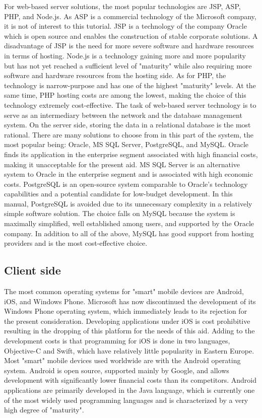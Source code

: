 For web-based server solutions, the most popular technologies are JSP, ASP, PHP, and Node.js. As ASP is a commercial technology of the Microsoft company, it is not of interest to this tutorial. JSP is a technology of the company Oracle which is open source and enables the construction of stable corporate solutions. A disadvantage of JSP is the need for more severe software and hardware resources in terms of hosting. Node.js is a technology gaining more and more popularity but has not yet reached a sufficient level of "maturity" while also requiring more software and hardware resources from the hosting side. As for PHP, the technology is narrow-purpose and has one of the highest "maturity" levels. At the same time, PHP hosting costs are among the lowest, making the choice of this technology extremely cost-effective. The task of web-based server technology is to serve as an intermediary between the network and the database management system. On the server side, storing the data in a relational database is the most rational. There are many solutions to choose from in this part of the system, the most popular being: Oracle, MS SQL Server, PostgreSQL, and MySQL. Oracle finds its application in the enterprise segment associated with high financial costs, making it unacceptable for the present aid. MS SQL Server is an alternative system to Oracle in the enterprise segment and is associated with high economic costs. PostgreSQL is an open-source system comparable to Oracle's technology capabilities and a potential candidate for low-budget development. In this manual, PostgreSQL is avoided due to its unnecessary complexity in a relatively simple software solution. The choice falls on MySQL because the system is maximally simplified, well established among users, and supported by the Oracle company. In addition to all of the above, MySQL has good support from hosting providers and is the most cost-effective choice.

\subsection{Client side}

The most common operating systems for "smart" mobile devices are Android, iOS, and Windows Phone. Microsoft has now discontinued the development of its Windows Phone operating system, which immediately leads to its rejection for the present consideration. Developing applications under iOS is cost prohibitive resulting in the dropping of this platform for the needs of this aid. Adding to the development costs is that programming for iOS is done in two languages, Objective-C and Swift, which have relatively little popularity in Eastern Europe. Most "smart" mobile devices used worldwide are with the Android operating system. Android is open source, supported mainly by Google, and allows development with significantly lower financial costs than its competitors. Android applications are primarily developed in the Java language, which is currently one of the most widely used programming languages and is characterized by a very high degree of "maturity".

